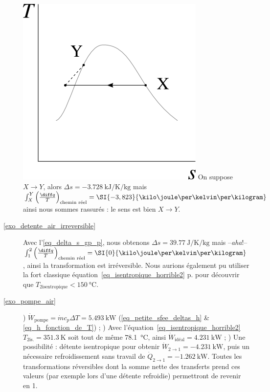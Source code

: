 \begin{description}
						\includegraphics[width=\solutiondiagramwidth]{images/exo_sol_ts_bonsens2.png}
						\tab On suppose $X\to Y$, alors $\Delta s = \SI{-3,728}{\kilo\joule\per\kelvin\per\kilogram}$ mais $\int_X^Y \left(\frac{\diff q}{T}\right)_\text{chemin réel} = \SI{-3,823}{\kilo\joule\per\kelvin\per\kilogram}$ ainsi nous sommes rassurés : le sens est bien $X\to Y$.
		\item [\ref{exo_detente_air_irreversible}]
						\tab Avec l’\cref{eq_delta_s_gp_p}, nous obtenons $\Delta s = \SI{+39,77}{\joule\per\kelvin\per\kilogram}$ mais --\textit{aha}!-- $\int_1^2 \left(\frac{\diff q}{T}\right)_\text{chemin réel} = \SI{0}{\kilo\joule\per\kelvin\per\kilogram}$, ainsi la transformation est irréversible. Nous aurions également pu utiliser la fort classique équation~\ref{eq_isentropique_horrible2} p.\pageref{eq_isentropique_horrible2} pour découvrir que $T_{2 \text{isentropique}} < \SI{150}{\degreeCelsius}$.
		\item [\ref{exo_pompe_air}] 	
						) $\dot{W}_\text{pompe} = \dot m c_p \Delta T = \SI{+5,493}{\kilo\watt}$ (\ref{eq_petite_sfee_deltas_h} \& \ref{eq_h_fonction_de_T}) ;
						) Avec l’équation~\ref{eq_isentropique_horrible2} $T_{2 \text{is.}} = \SI{351,3}{\kelvin}$ soit tout de même \SI{78,1}{\degreeCelsius}, ainsi $\dot{W}_\text{idéal} = \SI{+4,231}{\kilo\watt}$ ;
						) Une possibilité : détente isentropique pour obtenir $\dot{W}_{2\to 1} = \SI{-4,231}{\kilo\watt}$, puis un nécessaire refroidissement sans travail de $\dot{Q}_{2\to 1} = \SI{-1,262}{\kilo\watt}$. Toutes les transformations réversibles dont la somme nette des transferts prend ces valeurs (par exemple lors d’une détente refroidie) permettront de revenir en 1.

\end{description}
